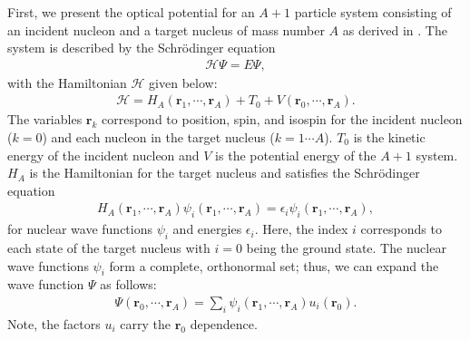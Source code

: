 \documentclass[preprintnumbers,floatfix,aps,prc,preprint,nofootinbib]{revtex4-1}
\begin{document}
First, we present the optical potential for an $A+1$ particle system consisting of an incident nucleon and a target nucleus of mass number $A$ as derived in \cite{Feshbach:1958nx}. The system is described by the Schr\"odinger equation
%
\begin{eqnarray}
	\label{eq:schrodinger_equation}
	\mathcal{H} \Psi = E \Psi,
\end{eqnarray}
%
with the Hamiltonian $\mathcal{H}$ given below:
%
\begin{eqnarray}
	\label{eq:total_hamiltonian}
	\mathcal{H} = H_A(\textbf{r}_1, \cdots , \textbf{r}_A) + T_0 + V(\textbf{r}_0, \cdots , \textbf{r}_A).
\end{eqnarray}
%
The variables $\textbf{r}_k$ correspond to position, spin, and isospin for the incident nucleon ($k=0$) and each nucleon in the target nucleus ($k=1 \cdots A$). $T_0$ is the kinetic energy of the incident nucleon and $V$ is the potential energy of the $A+1$ system. $H_A$ is the Hamiltonian for the target nucleus and satisfies the Schr\"odinger equation
%
\begin{eqnarray}
	\label{eq:nuclear_schrodinger_equation}
	H_A(\textbf{r}_1, \cdots , \textbf{r}_A) \psi_i(\textbf{r}_1, \cdots , \textbf{r}_A) = \epsilon_i \psi_i(\textbf{r}_1, \cdots , \textbf{r}_A),
\end{eqnarray}
%
for nuclear wave functions $\psi_i$ and energies $\epsilon_i$. Here, the index $i$ corresponds to each state of the target nucleus with $i=0$ being the ground state. The nuclear wave functions $\psi_i$ form a complete, orthonormal set; thus, we can expand the wave function $\Psi$ as follows:
%
\begin{eqnarray}
	\label{eq:wave_function}
	\Psi(\textbf{r}_0, \cdots , \textbf{r}_A) = \sum_{i} \psi_i(\textbf{r}_1, \cdots , \textbf{r}_A) u_i(\textbf{r}_0).
\end{eqnarray}
%
Note, the factors $u_i$ carry the $\textbf{r}_0$ dependence. 
\\
\end{document}
